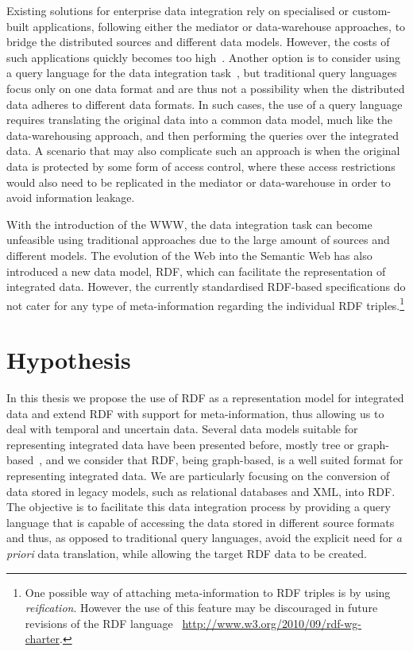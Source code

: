 Existing solutions for enterprise data integration rely on specialised or custom-built applications, following either
the mediator or data-warehouse approaches, to bridge the distributed sources and different data models.  However, the
costs of such applications quickly becomes too high~\cite{HalevyAshishBitton:2005aa}.
%
Another option is to consider using a query language for the data integration task~\cite{DraperHalevyWeld:2001aa}, but
traditional query languages focus only on one data format and are thus not a possibility when the distributed data
adheres to different data formats.
%
In such cases, the use of a query language requires translating the original data into a common data model, much like
the data-warehousing approach, and then performing the queries over the integrated data.  
%
A scenario that may also complicate such an approach is when the original data is protected by some form of access
control, where these access restrictions would also need to be replicated in the mediator or data-warehouse in order to
avoid information leakage.



With the introduction of the \ac{WWW}, the data integration task can become unfeasible using traditional approaches due
to the large amount of sources and different models.
%
The evolution of the Web into the Semantic Web has also introduced a new data model, \ac{RDF}, which can facilitate the
representation of integrated data.
%
However, the currently standardised \ac{RDF}-based specifications do not cater for any type of meta-information
regarding the individual \ac{RDF} triples.\footnote{One possible way of attaching meta-information to \ac{RDF} triples
  is by using \emph{reification}.  However the use of this feature may be discouraged in future revisions of the
  \ac{RDF} language \cf~\url{http://www.w3.org/2010/09/rdf-wg-charter}.}




\section{Hypothesis}
\label{sec:hypothesis}


In this thesis we propose the use of \ac{RDF} as a representation model for integrated data and extend \ac{RDF} with
support for meta-information, thus allowing us to deal with temporal and uncertain data.
%
Several data models suitable for representing integrated data have been presented before, mostly tree or
graph-based~\cite{CluetDelobelSimeon:1998aa,PapakonstantinouGarcia-MolinaWidom:1995aa,Abiteboul:1997aa}, and we consider
that \ac{RDF}, being graph-based, is a well suited format for representing integrated data. 
%
We are particularly focusing on the conversion of data stored in legacy models, such as relational databases and
\ac{XML}, into \ac{RDF}.
%
The objective is to facilitate this data integration process by providing a query language that is capable of accessing
the data stored in different source formats and thus, as opposed to traditional query languages, avoid the explicit need
for \textit{a priori} data translation, while allowing the target \ac{RDF} data to be created.


